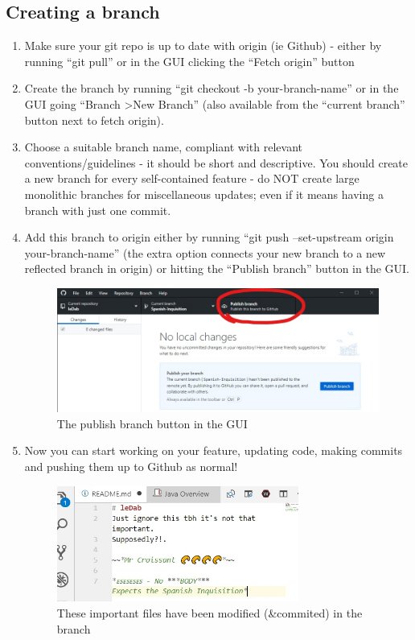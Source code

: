 \documentclass[a4paper, titlepage]{article}
\begin{document}
\subsection{Creating a branch}
\label{sec:BPRW_creating_branch}
\begin{enumerate}
	\item Make sure your git repo is up to date with origin (ie Github) - either by running ``git pull'' or in the GUI clicking the ``Fetch origin'' button
	\item Create the branch by running ``git checkout -b your-branch-name'' or in the GUI going ``Branch \textgreater New Branch'' (also available from the ``current branch'' button next to fetch origin).
	\item Choose a suitable branch name, compliant with relevant conventions/guidelines - it should be short and descriptive. You should create a new branch for every self-contained feature - do NOT create large monolithic branches for miscellaneous updates; even if it means having a branch with just one commit.
	\item Add this branch to origin either by running ``git push --set-upstream origin your-branch-name'' (the extra option connects your new branch to a new reflected branch in origin) or hitting the ``Publish branch'' button in the GUI.
	\begin{figure}[h]
		\centering
		\includegraphics[width=\textwidth]{1publish-branch}
		\caption{The publish branch button in the GUI}
	\end{figure}
	\item Now you can start working on your feature, updating code, making commits and pushing them up to Github as normal!
	\begin{figure}[h]
		\centering
		\includegraphics[width=0.75\textwidth]{2modified-file}
		\caption{These important files have been modified (\&commited) in the branch}
	\end{figure}
\end{enumerate}
\end{document}
